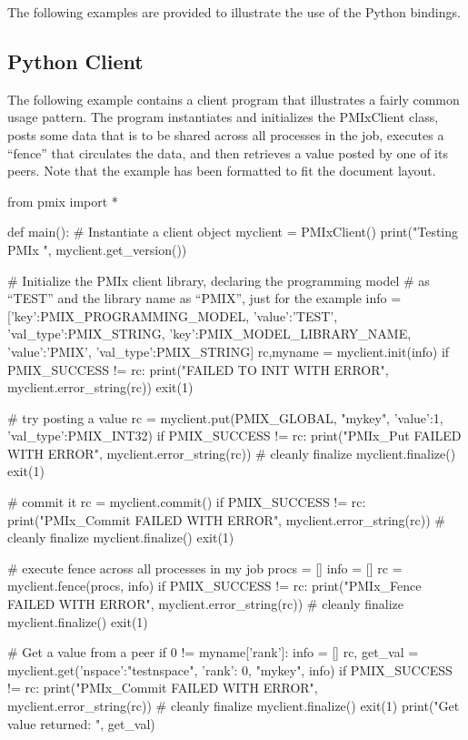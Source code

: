 The following examples are provided to illustrate the use of the Python bindings.

\subsection{Python Client}

The following example contains a client program that illustrates a fairly common usage pattern. The program instantiates and initializes the PMIxClient class, posts some data that is to be shared across all processes in the job, executes a “fence” that circulates the data, and then retrieves a value posted by one of its peers. Note that the example has been formatted to fit the document layout.


\pyspecificstart
\begin{codepar}
from pmix import *

def main():
    # Instantiate a client object
    myclient = PMIxClient()
    print("Testing PMIx ", myclient.get_version())

    # Initialize the PMIx client library, declaring the programming model
    # as “TEST” and the library name as “PMIX”, just for the example
    info = [{'key':PMIX_PROGRAMMING_MODEL,
             'value':'TEST', 'val_type':PMIX_STRING},
            {'key':PMIX_MODEL_LIBRARY_NAME,
             'value':'PMIX', 'val_type':PMIX_STRING}]
    rc,myname = myclient.init(info)
    if PMIX_SUCCESS != rc:
        print("FAILED TO INIT WITH ERROR", myclient.error_string(rc))
        exit(1)

    # try posting a value
    rc = myclient.put(PMIX_GLOBAL, "mykey",
                      {'value':1, 'val_type':PMIX_INT32})
    if PMIX_SUCCESS != rc:
        print("PMIx_Put FAILED WITH ERROR", myclient.error_string(rc))
        # cleanly finalize
        myclient.finalize()
        exit(1)

    # commit it
    rc = myclient.commit()
    if PMIX_SUCCESS != rc:
        print("PMIx_Commit FAILED WITH ERROR",
              myclient.error_string(rc))
        # cleanly finalize
        myclient.finalize()
        exit(1)

    # execute fence across all processes in my job
    procs = []
    info = []
    rc = myclient.fence(procs, info)
    if PMIX_SUCCESS != rc:
        print("PMIx_Fence FAILED WITH ERROR", myclient.error_string(rc))
        # cleanly finalize
        myclient.finalize()
        exit(1)

    # Get a value from a peer
    if 0 != myname['rank']:
        info = []
        rc, get_val = myclient.get({'nspace':"testnspace", 'rank': 0},
                                   "mykey", info)
        if PMIX_SUCCESS != rc:
            print("PMIx_Commit FAILED WITH ERROR",
                  myclient.error_string(rc))
            # cleanly finalize
            myclient.finalize()
            exit(1)
        print("Get value returned: ", get_val)


\end{codepar}
